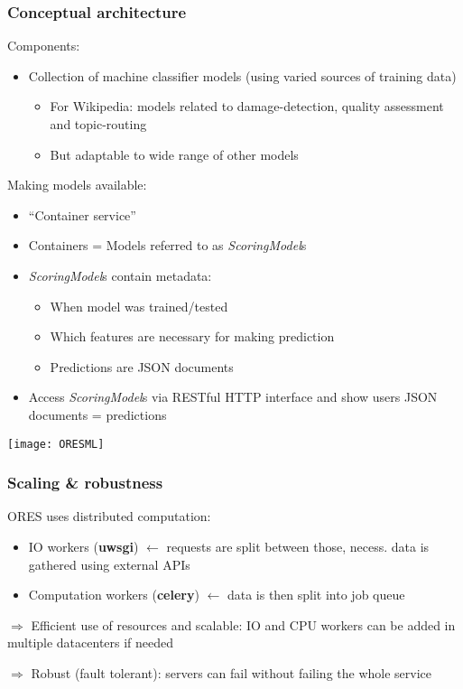 \documentclass[12pt,a4paper]{article}
\begin{document}
\subsubsection{Conceptual architecture}
Components:
\begin{itemize}
\item Collection of machine classifier models (using varied sources of training data)
\begin{itemize}
\item For Wikipedia: models related to damage-detection, quality assessment and topic-routing
\item But adaptable to wide range of other models
\end{itemize}
\end{itemize}
Making models available:
\begin{itemize}
\item ``Container service''
\item Containers = Models referred to as \textit{ScoringModel}s
\item \textit{ScoringModel}s contain metadata:
\begin{itemize}
\item When model was trained/tested
\item Which features are necessary for making prediction
\item Predictions are JSON documents
\end{itemize}
\item Access \textit{ScoringModel}s via RESTful HTTP interface and show users JSON documents = predictions
\end{itemize}
\texttt{[image: ORESML]}
\subsubsection{Scaling \& robustness}
ORES uses distributed computation:
\begin{itemize}
\item IO workers (\textbf{uwsgi}) \(\leftarrow\) requests are split between those, necess. data is gathered using external APIs
\item Computation workers (\textbf{celery}) \(\leftarrow\) data is then split into job queue 
\end{itemize}
\begin{description}
\item \(\Rightarrow\) Efficient use of resources and scalable: IO and CPU workers can be added in multiple datacenters if needed
\item \(\Rightarrow\) Robust (fault tolerant): servers can fail without failing the whole service
\end{description}
\end{document}
